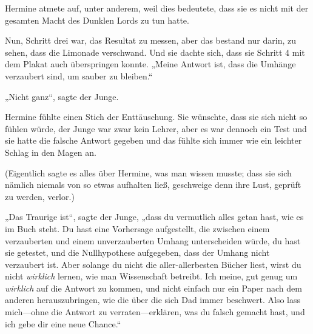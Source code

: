 Hermine atmete auf, unter anderem, weil dies bedeutete, dass sie es nicht mit der gesamten Macht des Dunklen Lords zu tun hatte.

Nun, Schritt drei war, das Resultat zu messen, aber das bestand nur darin, zu sehen, dass die Limonade verschwand. Und sie dachte sich, dass sie Schritt 4 mit dem Plakat auch überspringen konnte. „Meine Antwort ist, dass die Umhänge verzaubert sind, um sauber zu bleiben.“

„Nicht ganz“, sagte der Junge.

Hermine fühlte einen Stich der Enttäuschung. Sie wünschte, dass sie sich nicht so fühlen würde, der Junge war zwar kein Lehrer, aber es war dennoch ein Test und sie hatte die falsche Antwort gegeben und das fühlte sich immer wie ein leichter Schlag in den Magen an.

(Eigentlich sagte es alles über Hermine, was man wissen musste; dass sie sich nämlich niemals von so etwas aufhalten ließ, geschweige denn ihre Lust, geprüft zu werden, verlor.)

„Das Traurige ist“, sagte der Junge, „dass du vermutlich alles getan hast, wie es im Buch steht. Du hast eine Vorhersage aufgestellt, die zwischen einem verzauberten und einem unverzauberten Umhang unterscheiden würde, du hast sie getestet, und die Nullhypothese aufgegeben, dass der Umhang nicht verzaubert ist. Aber solange du nicht die aller-allerbesten Bücher liest, wirst du nicht \emph{wirklich} lernen, wie man Wissenschaft betreibt. Ich meine, gut genug um \emph{wirklich} auf die Antwort zu kommen, und nicht einfach nur ein Paper nach dem anderen herauszubringen, wie die über die sich Dad immer beschwert. Also lass mich—ohne die Antwort zu verraten—erklären, was du falsch gemacht hast, und ich gebe dir eine neue Chance.“

